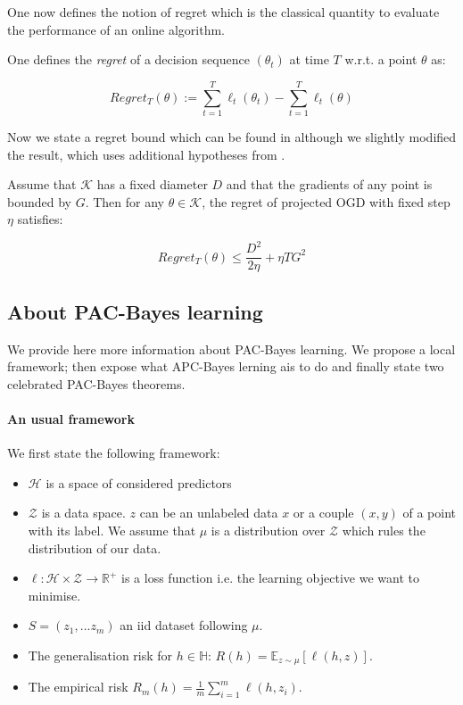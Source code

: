 One now defines the notion of regret which is the classical quantity to evaluate the performance of an online algorithm.
 \begin{definition}
One defines the \emph{regret} of a decision sequence $(\theta_t)$ at time $T$  w.r.t. a point $\theta$ as:

\[ Regret_T(\theta):= \sum_{t=1}^T \ell_t(\theta_t) -  \sum_{t=1}^T \ell_t(\theta)  \]


\end{definition}


Now we state a regret bound which can be found in \cite[Eq 2.5]{shalev2012online} although we slightly modified the result, which uses additional hypotheses from \cite{hazan2016introduction}.

\begin{proposition}
  \label{prop: OGD_bound}
  Assume that $\mathcal{K}$ has a fixed diameter $D$ and that the gradients of any point is bounded by $G$. Then for any $\theta\in\mathcal{K}$, the regret of projected OGD with fixed step $\eta$ satisfies:

  \[ Regret_T(\theta) \leq \frac{D^2}{2\eta} + \eta T G^2     \]
\end{proposition}


\subsection{About PAC-Bayes learning}

We provide here more information about PAC-Bayes learning. We propose a local framework; then expose what APC-Bayes lerning ais to do and finally state two celebrated PAC-Bayes theorems.

\paragraph{An usual framework}
We first state the following framework:
\begin{itemize}
  \item $\mathcal{H}$ is a space of considered predictors
  \item $\mathcal{Z}$ is a data space. $z$ can be an unlabeled data $x$ or a couple $(x,y)$ of a point with its label. We assume that $\mu$ is a distribution over $\mathcal{Z}$ which rules the distribution of our data.
  \item $\ell: \mathcal{H}\times \mathcal{Z}\rightarrow \mathbb{R}^+$ is a loss function i.e. the learning objective we want to minimise.
  \item $S=(z_1,...z_m)$ an iid dataset following $\mu$.
  \item The generalisation risk for $h\in\mathbb{H}$: $R(h)= \mathbb{E}_{z\sim \mu}[\ell(h,z)]$.
  \item The empirical risk $R_m(h)= \frac{1}{m}\sum_{i=1}^m \ell(h,z_i)$.
\end{itemize}


